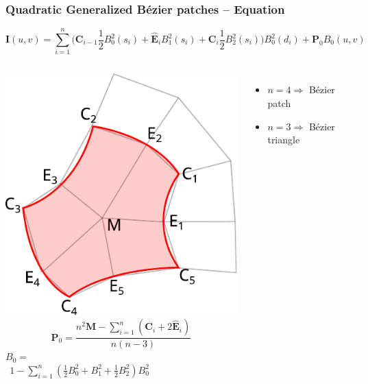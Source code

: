 \documentclass{beamer}
\begin{document}
\begin{frame}
  \frametitle{Quadratic Generalized B\'ezier patches -- Equation}
  \vspace{-1em}
  \[\!\!\!\!\!\!
    \mathbf{I}(u,v)=\sum_{i=1}^{n}\Bigg(\mathbf{C}_{i-1}\frac{1}{2}B_{0}^{2}(s_{i})+
    \hat{\mathbf{E}}_{i}B_{1}^{2}(s_{i})+
    \mathbf{C}_{i}\frac{1}{2}B_{2}^{2}(s_{i})\Bigg)B_{0}^{2}(d_{i})+
    \mathbf{P}_{0}B_{0}(u,v)\]
  \begin{columns}   
    \centering
    \includegraphics[width=\textwidth]{images/qgb.pdf}
    \[\mathbf{P}_{0}=\frac{n^{2}\mathbf{M}-\sum_{i=1}^{n}\left(\mathbf{C}_{i}+2\hat{\mathbf{E}}_{i}\right)}{n(n-3)}\]
    $B_{0}=$\\$\ \ 1-\sum_{i=1}^{n}\left(\frac{1}{2}B_{0}^{2}+B_{1}^{2}+\frac{1}{2}B_{2}^{2}\right)B_{0}^{2}$
    \vspace{1em}
    \begin{itemize}
    \item $n=4\Rightarrow$ B\'ezier patch
    \item $n=3\Rightarrow$ B\'ezier triangle
    \end{itemize}
  \end{columns}
\end{frame}
\end{document}
